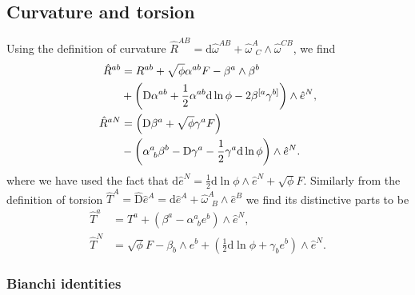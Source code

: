 \documentclass[aps,prd,12pt,superscriptaddress,showpacs,showkeys,longbibliography,reprint]{revtex4-1}
\begin{document}

\subsection{Curvature and torsion}
Using the definition of curvature
$\hat{R}^{AB}=\mbox{d}\hat{\omega}^{AB}+\hat{\omega}^A_{\ \ C}\wedge\hat{\omega}^{CB}$,
we find
\begin{align}\label{R1}
  \hat{R}^{ab}&=R^{ab}+\sqrt{\phi}\alpha^{ab}F-\beta^a\wedge\beta^b\notag\\
  &+\left(\mbox{D}\alpha^{ab}+\frac{1}{2}\alpha^{ab}\mbox{d}\ln\phi-2\beta^{[a}\gamma^{b]}\right)\wedge\hat{e}^N,\\
  \label{R2}
  \hat{R}^{aN}&=\left(\mbox{D}\beta^a+\sqrt{\phi}\gamma^a F\right)\notag\\
  &-\left(\alpha^a_{\ b}\beta^b-\mbox{D}\gamma^a-\frac{1}{2}\gamma^a\mbox{d}\ln\phi\right)\wedge\hat{e}^N.
\end{align}
where we have used the fact that
$
  \mbox{d}\hat{e}^N=\frac{1}{2}\mbox{d}\ln\phi\wedge\hat{e}^N+\sqrt{\phi}F.
$
Similarly from the definition of torsion
$\hat{T}^A = \hat{\mbox{D}}\hat{e}^A=\mbox{d}\hat{e}^A+\hat{\omega}^A_{\ \ B}\wedge\hat{e}^B$
we find its distinctive parts to be
\begin{align}\label{T1}
  \hat{T}^a &= T^a+\left(\beta^a-\alpha^a_{\ \ b}e^b\right)\wedge\hat{e}^N,\\
  \label{T2}
  \hat{T}^N &= \sqrt{\phi}F-\beta_b\wedge e^b+\left(\frac{1}{2}\mbox{d}\ln\phi+\gamma_be^b\right)\wedge\hat{e}^N.
\end{align}

\subsubsection{Bianchi identities}
\end{document}
